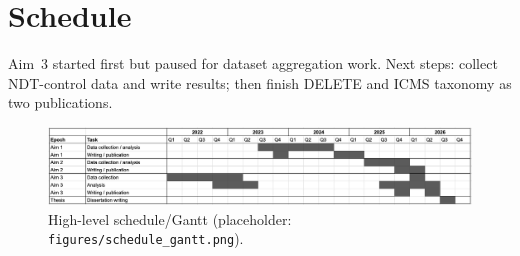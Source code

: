 \documentclass[12pt,oneside]{report}
\begin{document}
\chapter{Schedule}
Aim~3 started first but paused for dataset aggregation work. Next steps: collect NDT-control data and write results; then finish DELETE and ICMS taxonomy as two publications.

\begin{figure}[h]
  \centering
  \includegraphics[width=0.5\linewidth]{ch5_schedule_gantt.png}
  \caption{High-level schedule/Gantt (placeholder: \texttt{figures/schedule\_gantt.png}).}
  \label{fig:schedule}
\end{figure}

\cleardoublepage
\printbibliography
\end{document}
